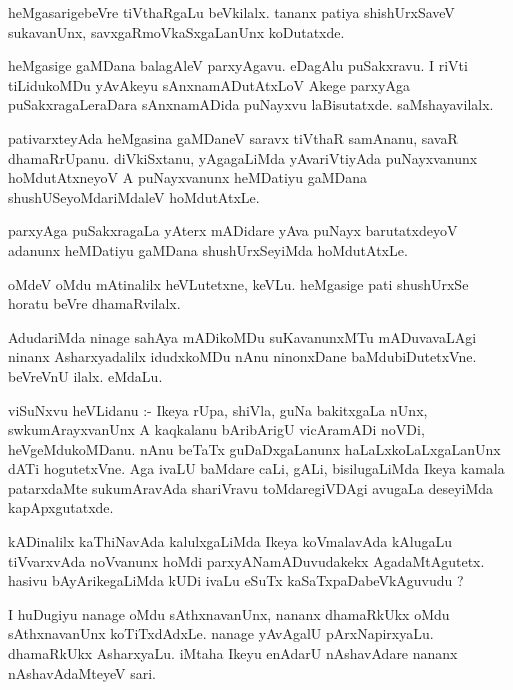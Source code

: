 \documentclass{article}
\begin{document}
\begin{mn}
heMgasarigebeVre tiVthaRgaLu beVkilalx.  tananx patiya  shishUrxSaveV  sukavanUnx, 
savxgaRmoVkaSxgaLanUnx koDutatxde.
\end{mn}

\begin{mn}
heMgasige gaMDana balagAleV  parxyAgavu.  eDagAlu puSakxravu.  I riVti tiLidukoMDu yAvAkeyu  
sAnxnamADutAtxLoV Akege  parxyAga  puSakxragaLeraDara  sAnxnamADida  puNayxvu  laBisutatxde.  saMshayavilalx.
\end{mn}

\begin{mn}
pativarxteyAda heMgasina gaMDaneV saravx  tiVthaR samAnanu, savaR dhamaRrUpanu.  
diVkiSxtanu,  yAgagaLiMda yAvariVtiyAda puNayxvanunx hoMdutAtxneyoV A puNayxvanunx 
heMDatiyu  gaMDana shushUSeyoMdariMdaleV hoMdutAtxLe. 
\end{mn}

\begin{mn}
parxyAga puSakxragaLa yAterx mADidare yAva puNayx barutatxdeyoV adanunx heMDatiyu gaMDana shushUrxSeyiMda hoMdutAtxLe. 
\end{mn}

\begin{mn}
oMdeV oMdu mAtinalilx heVLutetxne,  keVLu.  heMgasige pati shushUrxSe horatu beVre dhamaRvilalx.
\end{mn}

\begin{mn}
AdudariMda ninage sahAya mADikoMDu  suKavanunxMTu mADuvavaLAgi ninanx Asharxyadalilx idudxkoMDu 
nAnu ninonxDane baMdubiDutetxVne.  beVreVnU  ilalx.  eMdaLu.
\end{mn}

\begin{mn}
viSuNxvu heVLidanu :- Ikeya rUpa, shiVla, guNa bakitxgaLa nUnx, swkumArayxvanUnx A kaqkalanu  
bAribArigU vicAramADi noVDi, heVgeMdukoMDanu.  nAnu beTaTx guDaDxgaLanunx haLaLxkoLaLxgaLanUnx 
dATi  hogutetxVne. Aga ivaLU baMdare caLi, gALi, bisilugaLiMda Ikeya kamala  patarxdaMte 
sukumAravAda shariVravu toMdaregiVDAgi  avugaLa  deseyiMda kapApxgutatxde.
\end{mn}

\begin{mn}
kADinalilx kaThiNavAda kalulxgaLiMda Ikeya koVmalavAda kAlugaLu tiVvarxvAda noVvanunx hoMdi 
parxyANamADuvudakekx AgadaMtAgutetx. hasivu bAyArikegaLiMda kUDi ivaLu eSuTx kaSaTxpaDabeVkAguvudu ?
\end{mn}

\begin{mn}
I huDugiyu nanage oMdu sAthxnavanUnx,  nananx dhamaRkUkx  oMdu sAthxnavanUnx  
koTiTxdAdxLe.  nanage yAvAgalU pArxNapirxyaLu.  dhamaRkUkx AsharxyaLu.  
iMtaha Ikeyu enAdarU  nAshavAdare nananx nAshavAdaMteyeV sari.
\end{mn}
\end{document}
